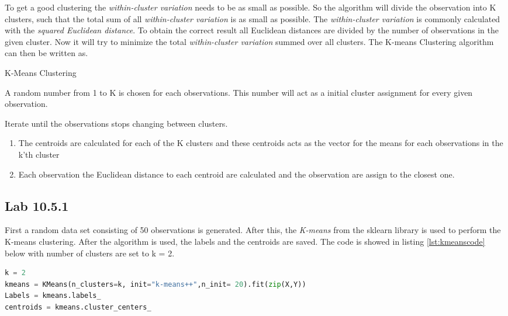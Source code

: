 To get a good clustering the \emph{within-cluster variation} needs to be as small as possible. So the algorithm will divide the observation into K clusters, such that the total sum of all \emph{within-cluster variation} is as small as possible. The \emph{within-cluster variation} is commonly calculated with the \emph{squared Euclidean distance}. To obtain the correct result all Euclidean distances are divided by the number of observations in the given cluster. Now it will try to minimize the total \emph{within-cluster variation} summed over all clusters.
The K-means Clustering algorithm can then be written as.

\begin{algorithm}
	\caption{K-Means Clustering}
	\label{algo:KMeansClustering}
	\begin{algorithmic}[1]
		\State A random number from 1 to K is chosen for each observations. This number will act as a initial cluster assignment for every given observation.
		
		\State 
		Iterate until the observations stops changing between clusters.
		\begin{enumerate}[label=(\alph*)]
			\item The centroids are calculated for each of the K clusters and these centroids acts as the vector for the means for each observations in the k'th cluster
			
			\item Each observation the Euclidean distance to each centroid are calculated and the observation are assign to the closest one.
		\end{enumerate}
	\end{algorithmic}
\end{algorithm}

\subsection{Lab 10.5.1}
First a random data set consisting of 50 observations is generated. After this, the \emph{K-means} from the sklearn library is used to perform the K-means clustering.
After the algorithm is used, the labels and the centroids are saved. The code is showed in listing \ref{lst:kmeanscode} below with number of clusters are set to k = 2.
\begin{lstlisting}[language=Python, label=lst:kmeanscode, caption=The KMean function and the code which saves the labels and the centroids]
k = 2
kmeans = KMeans(n_clusters=k, init="k-means++",n_init= 20).fit(zip(X,Y))
Labels = kmeans.labels_
centroids = kmeans.cluster_centers_
\end{lstlisting}

